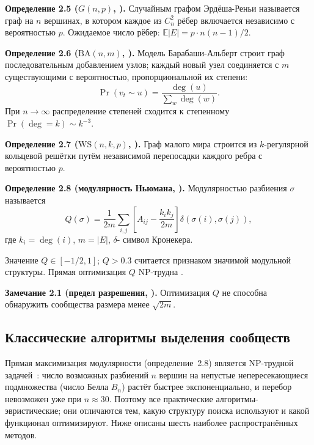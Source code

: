 \documentclass[14pt,a4paper]{extarticle}
\newcommand{\definition}[2]{\par\noindent\textbf{Определение #1.} #2\par}
\newcommand{\remark}[2]{\par\noindent\textbf{Замечание #1.} #2\par}
\begin{document}
\definition{2.5 ($G(n, p)$, \cite{erdos1959})}{Случайным графом Эрдёша-Реньи называется граф на $n$ вершинах, в котором каждое из $C_n^2$ рёбер включается независимо с вероятностью $p$. Ожидаемое число рёбер: $\mathbb{E}|E| = p \cdot n(n-1)/2$.}

\definition{2.6 ($\mathrm{BA}(n, m)$, \cite{barabasi1999})}{Модель Барабаши-Альберт строит граф последовательным добавлением узлов; каждый новый узел соединяется с $m$ существующими с вероятностью, пропорциональной их степени:
\begin{equation}
\Pr(v_t \sim u) = \frac{\deg(u)}{\sum_{w} \deg(w)}.
\end{equation}
При $n \to \infty$ распределение степеней сходится к степенному $\Pr(\deg = k) \sim k^{-3}$.}

\definition{2.7 ($\mathrm{WS}(n, k, p)$, \cite{watts1998})}{Граф малого мира строится из $k$-регулярной кольцевой решётки путём независимой перепосадки каждого ребра с вероятностью $p$.}

\definition{2.8 (модулярность Ньюмана, \cite{girvan2002})}{Модулярностью разбиения $\sigma$ называется
\begin{equation}
Q(\sigma) = \frac{1}{2m} \sum_{i,j} \left[ A_{ij} - \frac{k_i k_j}{2m} \right] \delta(\sigma(i), \sigma(j)),
\label{eq:modularity}
\end{equation}
где $k_i = \deg(i)$, $m = |E|$, $\delta$- символ Кронекера.}

Значение $Q \in [-1/2, 1]$; $Q > 0.3$ считается признаком значимой модульной структуры. Прямая оптимизация $Q$ NP-трудна \cite{brandes2008}.

\remark{2.1 (предел разрешения, \cite{fortunato2007})}{Оптимизация $Q$ не способна обнаружить сообщества размера менее $\sqrt{2m}$.}

\subsection{Классические алгоритмы выделения сообществ}

Прямая максимизация модулярности (определение~2.8) является NP-трудной задачей~\cite{brandes2008}: число возможных разбиений $n$ вершин на непустые непересекающиеся подмножества (число Белла $B_n$) растёт быстрее экспоненциально, и перебор невозможен уже при $n \approx 30$. Поэтому все практические алгоритмы- эвристические; они отличаются тем, какую структуру поиска используют и какой функционал оптимизируют. Ниже описаны шесть наиболее распространённых методов.
\end{document}
